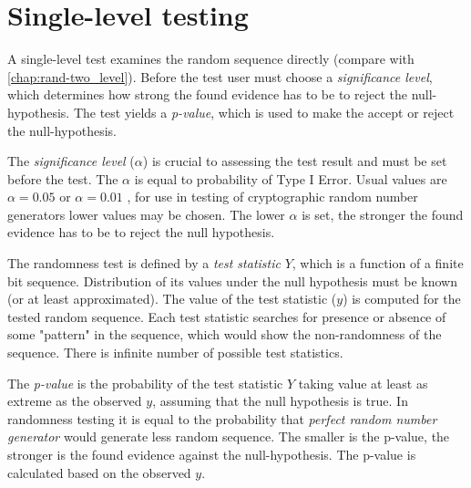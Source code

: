 \documentclass[
  digital,     %
  oneside,     %
  nosansbold,  %
  nocolorbold, %
  nolof,         %
  nolot,         %
]{fithesis4}
\begin{document}
\section{Single-level testing} \label{chap:rand-single}

A single-level test examines the random sequence directly (compare with \ref{chap:rand-two_level}). Before the test user must choose a \emph{significance level}, which determines how strong the found evidence has to be to reject the null-hypothesis. The test yields a \emph{p-value}, which is used to make the accept or reject the null-hypothesis.

The \emph{significance level} ($\alpha$) is crucial to assessing the test result and must be set before the test. The $\alpha$ is equal to probability of Type I Error. Usual values are $\alpha = 0.05$ or $\alpha = 0.01$ \cite[p. 390]{basic_practice}, for use in testing of cryptographic random number generators lower values may be chosen. \cite[p. 1-4]{nist_special} The lower $\alpha$ is set, the stronger the found evidence has to be to reject the null hypothesis. %


The randomness test is defined by a \emph{test statistic} $Y$, which is a function of a finite bit sequence. Distribution of its values under the null hypothesis must be known (or at least approximated). The value of the test statistic ($y$) is computed for the tested random sequence. Each test statistic searches for presence or absence of some "pattern" in the sequence, which would show the non-randomness of the sequence. There is infinite number of possible test statistics. \cite[p. 4]{tu01_paper}


The \emph{p-value} is the probability of the test statistic $Y$ taking value at least as extreme as the observed $y$, assuming that the null hypothesis is true. In randomness testing it is equal to the probability that \emph{perfect random number generator} would generate less random sequence. The smaller is the p-value, the stronger is the found evidence against the null-hypothesis. \cite[p. 386]{basic_practice} The p-value is calculated based on the observed $y$.
\end{document}
